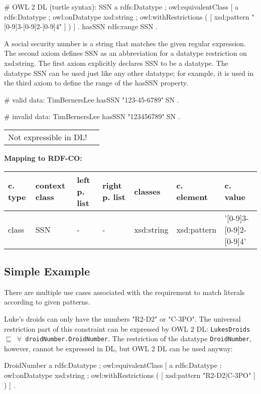 \documentclass{llncs}
\newcommand{\ms}[1]{\texttt{#1}}
\newenvironment{gcotable}{
  \scriptsize
  \sffamily
  \vspace{0cm}
	\begin{center}
	\textbf{\vspace{0.4cm}Mapping to RDF-CO:} \\
  \begin{tabular}{l|l|l|l|l|l|l}
	\hline
  \textbf{c. type} & \textbf{context class} & \textbf{left p. list} & \textbf{right p. list} & \textbf{classes} & \textbf{c. element} & \textbf{c. value} \\
  \hline

}{
  \hline
  \end{tabular}
	\end{center}
}
\newenvironment{DL}{
  \vspace{0cm}
	\begin{center}
  \begin{tabular}{r l}

}{
  \end{tabular}
	\end{center}
}
\begin{document}
\begin{ex}
# OWL 2 DL (turtle syntax):
SSN 
    a rdfs:Datatype ;
    owl:equivalentClass [
        a rdfs:Datatype ;
        owl:onDatatype xsd:string ;
        owl:withRestrictions ( 
            [ xsd:pattern "[0-9]{3}-[0-9]{2}-[0-9]{4}" ] ) ] .
hasSSN rdfs:range SSN .
\end{ex}

A social security number is a string that matches the given regular expression. 
The second axiom defines SSN as an abbreviation for a datatype restriction on xsd:string. 
The first axiom explicitly declares SSN to be a datatype. 
The datatype SSN can be used just like any other datatype; 
for example, it is used in the third axiom to define the range of the hasSSN property. 

\begin{ex}
# valid data:
TimBernersLee
    hasSSN "123-45-6789"^^SSN .
\end{ex}

\begin{ex}
# invalid data:
TimBernersLee
    hasSSN "123456789"^^SSN .
\end{ex}

\begin{DL}
Not expressible in DL!
\end{DL}

\begin{gcotable}
class & SSN & - & - & xsd:string & xsd:pattern & '[0-9]{3}-[0-9]{2}-[0-9]{4}' \\
\end{gcotable}

\subsection{Simple Example}

There are multiple use cases associated with the requirement to match literals according to given patterns.

Luke's droids can only have the numbers "R2-D2" or "C-3PO".
The universal restriction part of this constraint can be expressed by OWL 2 DL:
\ms{LukesDroids $\sqsubseteq$ $\forall$ droidNumber.DroidNumber}.
The restriction of the datatype \ms{DroidNumber}, however, cannot be expressed in DL, but OWL 2 DL can be used anyway:

\begin{ex}
DroidNumber 
    a rdfs:Datatype ;
    owl:equivalentClass [
        a rdfs:Datatype ;
        owl:onDatatype xsd:string ;
        owl:withRestrictions ( 
            [ xsd:pattern "R2-D2|C-3PO" ] ) ] .
\end{ex}
\end{document}
